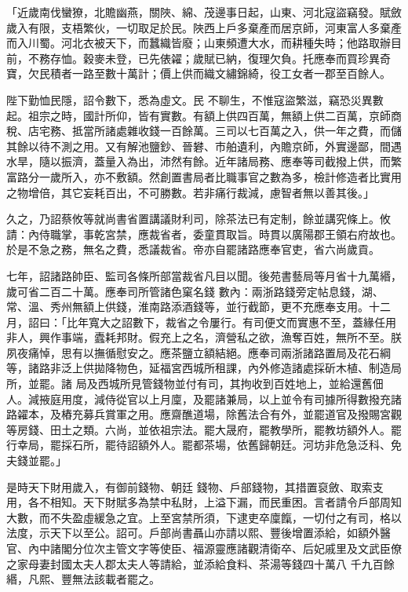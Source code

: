 \begin{pinyinscope}
 「近歲南伐蠻獠，北贍幽燕，關陜、綿、茂邊事日起，山東、河北寇盜竊發。賦斂歲入有限，支梧繁伙，一切取足於民。陜西上戶多棄產而居京師，河東富人多棄產而入川蜀。河北衣被天下，而蠶織皆廢；山東頻遭大水，而耕種失時；他路取辦目前，不務存恤。穀麥未登，已先俵糴；歲賦已納，復理欠負。托應奉而買珍異奇寶，欠民積者一路至數十萬計；價上供而織文繡錦綺，役工女者一郡至百餘人。



 陛下勤恤民隱，詔令數下，悉為虛文。民
 不聊生，不惟寇盜繁滋，竊恐災異數起。祖宗之時，國計所仰，皆有實數。有額上供四百萬，無額上供二百萬，京師商稅、店宅務、抵當所諸處雜收錢一百餘萬。三司以七百萬之入，供一年之費，而儲其餘以待不測之用。又有解池鹽鈔、晉礬、市舶遺利，內贍京師，外實邊鄙，間遇水旱，隨以振濟，蓋量入為出，沛然有餘。近年諸局務、應奉等司截撥上供，而繁富路分一歲所入，亦不敷額。然創置書局者比職事官之數為多，檢計修造者比實用
 之物增倍，其它妄耗百出，不可勝數。若非痛行裁減，慮智者無以善其後。」



 久之，乃詔蔡攸等就尚書省置講議財利司，除茶法已有定制，餘並講究條上。攸請：內侍職掌，事乾宮禁，應裁省者，委童貫取旨。時貫以廣陽郡王領右府故也。於是不急之務，無名之費，悉議裁省。帝亦自罷諸路應奉官吏，省六尚歲貢。



 七年，詔諸路帥臣、監司各條所部當裁省凡目以聞。後苑書藝局等月省十九萬緡，歲可省二百二十萬。應奉司所管諸色窠名錢
 數內：兩浙路錢旁定帖息錢，湖、常、溫、秀州無額上供錢，淮南路添酒錢等，並行截節，更不充應奉支用。十二月，詔曰：「比年寬大之詔數下，裁省之令屢行。有司便文而實惠不至，蓋緣任用非人，興作事端，蠹耗邦財。假充上之名，濟營私之欲，漁奪百姓，無所不至。朕夙夜痛悼，思有以撫循慰安之。應茶鹽立額結絕。應奉司兩浙諸路置局及花石綱等，諸路非泛上供拋降物色，延福宮西城所租課，內外修造諸處採斫木植、制造局所，並罷。諸
 局及西城所見管錢物並付有司，其拘收到百姓地上，並給還舊佃人。減掖庭用度，減侍從官以上月廩，及罷諸兼局，以上並令有司據所得數撥充諸路糴本，及樁充募兵賞軍之用。應齋醮道場，除舊法合有外，並罷道官及撥賜宮觀等房錢、田土之類。六尚，並依祖宗法。罷大晟府，罷教學所，罷教坊額外人。罷行幸局，罷採石所，罷待詔額外人。罷都茶場，依舊歸朝廷。河坊非危急泛科、免夫錢並罷。」



 是時天下財用歲入，有御前錢物、朝廷
 錢物、戶部錢物，其措置裒斂、取索支用，各不相知。天下財賦多為禁中私財，上溢下漏，而民重困。言者請令戶部周知大數，而不失盈虛緩急之宜。上至宮禁所須，下逮吏卒廩餼，一切付之有司，格以法度，示天下以至公。詔可。戶部尚書聶山亦請以熙、豐後增置添給，如額外醫官、內中諸閣分位次主管文字等使臣、福源靈應諸觀清衛卒、后妃戚里及文武臣僚之家母妻封國太夫人郡太夫人等請給，並添給食料、茶湯等錢四十萬八
 千九百餘緡，凡熙、豐無法該載者罷之。




\end{pinyinscope}
